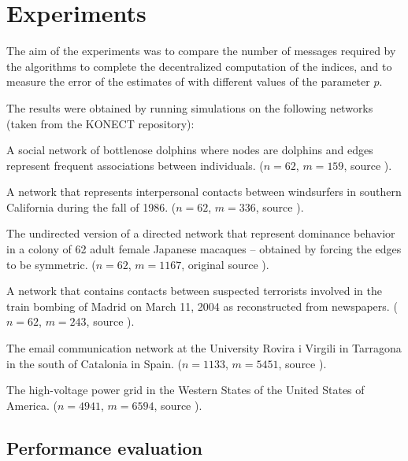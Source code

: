 
\section{Experiments}
\label{sec:exp}

The aim of the experiments was to compare the number of messages required by the algorithms to complete the decentralized computation of the indices, and to measure the error of the estimates of \multibfs{} with different values of the parameter $p$.

The results were obtained by running simulations on the following networks (taken from the KONECT \cite{konect} repository):
\begin{description}[leftmargin=0cm]
 \item[\texttt{dolphins}] A social network of bottlenose dolphins where nodes are dolphins and edges represent frequent associations between individuals. ($n=62$, $m=159$, source \cite{network:dolphins}).
 \item[\texttt{surf}] A network that represents interpersonal contacts between windsurfers in southern California during the fall of 1986. ($n=62$, $m=336$, source \cite{network:surf}).
 \item[\texttt{macaques}] The undirected version of a directed network that represent dominance behavior in a colony of 62 adult female Japanese macaques -- obtained by forcing the edges to be symmetric. ($n=62$, $m=1167$, original source \cite{network:mac}).
 \item[\texttt{train}] A network that contains contacts between suspected terrorists involved in the train bombing of Madrid on March 11, 2004 as reconstructed from newspapers. ($n=62$, $m=243$, source \cite{network:train}).
 \item[\texttt{email}] The email communication network at the University Rovira i Virgili in Tarragona in the south of Catalonia in Spain. ($n=1133$, $m=5451$, source \cite{network:email}).
 \item[\texttt{powergrid}] The high-voltage power grid in the Western States of the United States of America. ($n=4941$, $m=6594$, source \cite{network:powergrid}).
\end{description}

\subsection{Performance evaluation}

